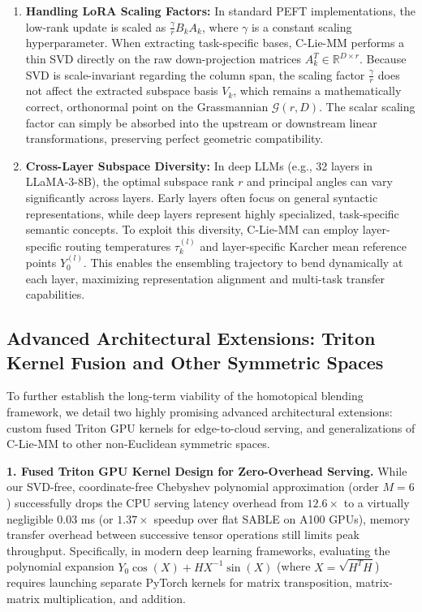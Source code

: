 \documentclass{article}
\theoremstyle{plain}
\theoremstyle{definition}
\theoremstyle{remark}
\begin{document}
\begin{enumerate}
    \item \textbf{Handling LoRA Scaling Factors:} In standard PEFT implementations, the low-rank update is scaled as $\frac{\gamma}{r} B_k A_k$, where $\gamma$ is a constant scaling hyperparameter. When extracting task-specific bases, C-Lie-MM performs a thin SVD directly on the raw down-projection matrices $A_k^T \in \mathbb{R}^{D \times r}$. Because SVD is scale-invariant regarding the column span, the scaling factor $\frac{\gamma}{r}$ does not affect the extracted subspace basis $V_k$, which remains a mathematically correct, orthonormal point on the Grassmannian $\mathcal{G}(r, D)$. The scalar scaling factor can simply be absorbed into the upstream or downstream linear transformations, preserving perfect geometric compatibility.
    \item \textbf{Cross-Layer Subspace Diversity:} In deep LLMs (e.g., 32 layers in LLaMA-3-8B), the optimal subspace rank $r$ and principal angles can vary significantly across layers. Early layers often focus on general syntactic representations, while deep layers represent highly specialized, task-specific semantic concepts. To exploit this diversity, C-Lie-MM can employ layer-specific routing temperatures $\tau_k^{(l)}$ and layer-specific Karcher mean reference points $Y_0^{(l)}$. This enables the ensembling trajectory to bend dynamically at each layer, maximizing representation alignment and multi-task transfer capabilities.
\end{enumerate}

\subsection{Advanced Architectural Extensions: Triton Kernel Fusion and Other Symmetric Spaces}
\label{sec:appendix_extensions}

To further establish the long-term viability of the homotopical blending framework, we detail two highly promising advanced architectural extensions: custom fused Triton GPU kernels for edge-to-cloud serving, and generalizations of C-Lie-MM to other non-Euclidean symmetric spaces.

\textbf{1. Fused Triton GPU Kernel Design for Zero-Overhead Serving.}
While our SVD-free, coordinate-free Chebyshev polynomial approximation (order $M=6$) successfully drops the CPU serving latency overhead from $12.6\times$ to a virtually negligible $0.03$ ms (or $1.37\times$ speedup over flat SABLE on A100 GPUs), memory transfer overhead between successive tensor operations still limits peak throughput. Specifically, in modern deep learning frameworks, evaluating the polynomial expansion $Y_0 \cos(X) + H X^{-1} \sin(X)$ (where $X = \sqrt{H^T H}$) requires launching separate PyTorch kernels for matrix transposition, matrix-matrix multiplication, and addition.
\end{document}
